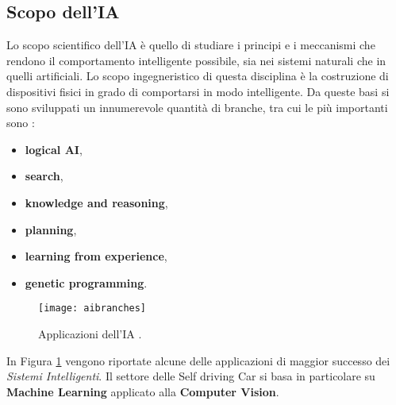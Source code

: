 \subsection{Scopo dell'IA}
Lo scopo scientifico  dell'IA è quello di studiare i principi e i meccanismi che rendono il comportamento intelligente possibile, sia
nei sistemi naturali che in quelli artificiali. Lo scopo ingegneristico di questa disciplina è la costruzione di dispositivi fisici
in grado di comportarsi in modo intelligente. Da queste basi si sono sviluppati un innumerevole quantità di branche, tra cui le più importanti sono \cite{ai}:
\begin{itemize}
  \item \textbf{logical AI},
  \item \textbf{search},
  \item \textbf{knowledge and reasoning},
  \item \textbf{planning},
  \item \textbf{learning from experience},
  \item \textbf{genetic programming}.
\end{itemize}
\begin{figure}
  \texttt{[image: aibranches]}
  \caption{Applicazioni dell'IA \cite{branch}.}
  \label{fig:branches}
\end{figure}
In Figura \ref{fig:branches} vengono riportate alcune delle applicazioni di maggior successo dei \emph{Sistemi Intelligenti}.
Il settore delle Self driving Car si basa in particolare su \textbf{Machine Learning} applicato alla \textbf{Computer Vision}.

